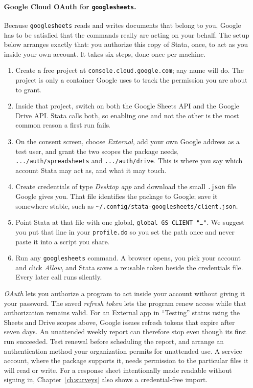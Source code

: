 \paragraph{Google Cloud OAuth for \texttt{googlesheets}.} Because \texttt{googlesheets} reads and writes documents that belong to you, Google has to be satisfied that the commands really are acting on your behalf. The setup below arranges exactly that: you authorize this copy of Stata, once, to act as you inside your own account. It takes six steps, done once per machine.
\begin{enumerate}
    \item Create a free project at \texttt{console.cloud.google.com}; any name will do. The project is only a container Google uses to track the permission you are about to grant.
    \item Inside that project, switch on both the Google Sheets API and the Google Drive API. Stata calls both, so enabling one and not the other is the most common reason a first run fails.
    \item On the consent screen, choose \emph{External}, add your own Google address as a test user, and grant the two scopes the package needs, \texttt{.../auth/spreadsheets} and \texttt{.../auth/drive}. This is where you say which account Stata may act as, and what it may touch.
    \item Create credentials of type \emph{Desktop app} and download the small \texttt{.json} file Google gives you. That file identifies the package to Google; save it somewhere stable, such as \texttt{\~{}/.config/stata-googlesheets/client.json}.
    \item Point Stata at that file with one global, \texttt{global GS\_CLIENT "\ldots"}. We suggest you put that line in your \texttt{profile.do} so you set the path once and never paste it into a script you share.
    \item Run any \texttt{googlesheets} command. A browser opens, you pick your account and click \emph{Allow}, and Stata saves a reusable token beside the credentials file. Every later call runs silently.
\end{enumerate}
\emph{OAuth} lets you authorize a program to act inside your account without giving it your password. The saved \emph{refresh token} lets the program renew access while that authorization remains valid. For an External app in \enquote{Testing} status using the Sheets and Drive scopes above, Google issues refresh tokens that expire after seven days. An unattended weekly report can therefore stop even though its first run succeeded. Test renewal before scheduling the report, and arrange an authentication method your organization permits for unattended use. A service account, where the package supports it, needs permission to the particular files it will read or write. For a response sheet intentionally made readable without signing in, Chapter~\ref{ch:surveys} also shows a credential-free import.

